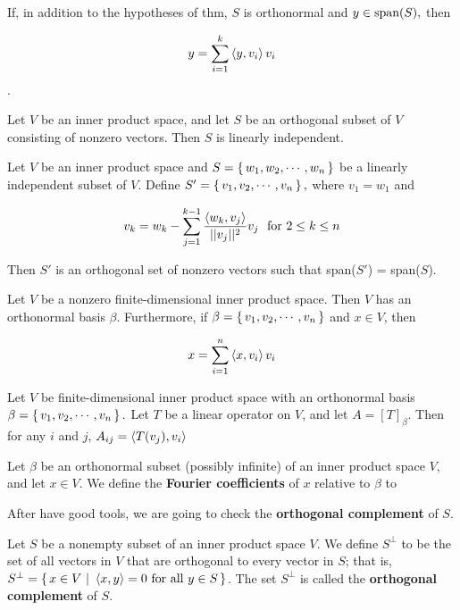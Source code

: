 \begin{cor*}
	If, in addition to the hypotheses of thm, $S$ is orthonormal and $y \in \text{span($S$)},$ then
	
	$$y = \sum^k_{i=1}\left< y,v_i \right>v_i$$.
\end{cor*}

\begin{cor*}
	Let $V$ be an inner product space, and let $S$ be an orthogonal subset of $V$ consisting of nonzero vectors. Then $S$ is linearly independent.
\end{cor*}


\begin{thm*}
	Let $V$ be an inner product space and $S = \left\{ \,w_1,w_2,\cdots,w_n \,\right\}$ be a linearly independent subset of $V$. Define $S' = \left\{ \,v_1,v_2,\cdots,v_n \,\right\},$ where $v_1 = w_1$ and
	
	$$v_k = w_k - \sum^{k-1}_{j=1}\dfrac{\left< w_k,v_j \right>}{||v_j||^2}v_j ~\text{ for $2 \leq k \leq n$}$$ 
	
	Then $S'$ is an orthogonal set of nonzero vectors such that span($S'$) = span($S$).
\end{thm*}

\begin{thm*}
	Let $V$ be a nonzero finite-dimensional inner product space. Then $V$ has an orthonormal basis $\beta$. Furthermore, if $\beta = \left\{ \,v_1,v_2,\cdots,v_n \,\right\}$ and $x \in V$, then
	
	$$x = \sum^n_{i=1}\left< x,v_i \right>v_i$$
\end{thm*}

\begin{cor*}
	Let $V$ be finite-dimensional inner product space with an orthonormal basis $\beta = \left\{ \,v_1,v_2,\cdots,v_n \,\right\}.$ Let $T$ be a linear operator on $V$, and let $A = [T]_{\beta}$. Then for any $i$ and $j$, $A_{ij} = \left< T(v_j),v_i \right>$
\end{cor*}

\begin{defn}
	Let $\beta$ be an orthonormal subset (possibly infinite) of an inner product space $V$, and let $x \in V$. We define the \textbf{Fourier coefficients} of $x$ relative to $\beta$ to  
\end{defn}

\begin{tcolorbox}
	After have good tools, we are going to check the \textbf{orthogonal complement} of $S$.
\end{tcolorbox}

\begin{defn}
	Let $S$ be a nonempty subset of an inner product space $V$. We define $S^{\perp}$ to be the set of all vectors in $V$ that are orthogonal to every vector in $S$; that is, $S^{\perp} = \left\{ \,x \in V~|~\left< x,y \right> = 0 \text{ for all } y \in S \,\right\}$. The set $S^{\perp}$ is called the \textbf{orthogonal complement} of $S$.
\end{defn}

